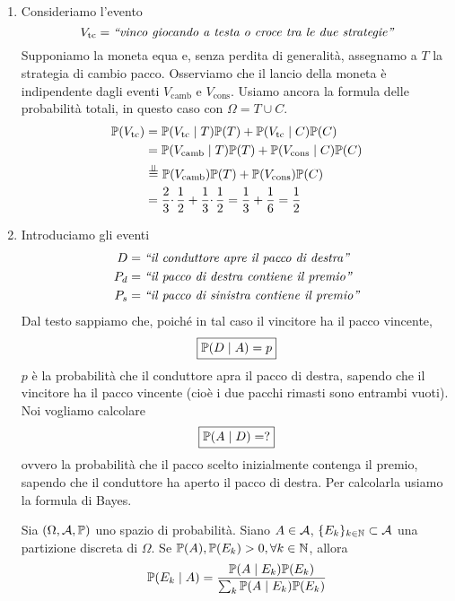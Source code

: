 \begin{enumerate}
	\item Consideriamo l'evento
	\begin{equation*}
		V_{\text{tc}} =\emph{``vinco giocando a testa o croce tra le due strategie''}
	\end{equation*}
	Supponiamo la moneta equa e, senza perdita di generalità, assegnamo a $T$ la strategia di cambio pacco. Osserviamo che il lancio della moneta è indipendente dagli eventi $V_{\text{camb}}$ e $V_{\text{cons}}$. Usiamo ancora la formula delle probabilità totali, in questo caso con $\Omega =T\cup C$.
	\begin{align*}
		\mathbb{P}(V_{\text{tc}}) & =\mathbb{P}(V_{\text{tc}} \mid T)\mathbb{P}(T) +\mathbb{P}(V_{\text{tc}} \mid C)\mathbb{P}(C) \\
		 & =\mathbb{P}(V_{\text{camb}} \mid T)\mathbb{P}(T) +\mathbb{P}(V_{\text{cons}} \mid C)\mathbb{P}(C) \\
		 & \overset{\perp \!\!\! \perp}{=} \mathbb{P}(V_{\text{camb}})\mathbb{P}(T) +\mathbb{P}(V_{\text{cons}})\mathbb{P}(C) \\
		 & =\frac{2}{3} \cdotp \frac{1}{2} +\frac{1}{3} \cdotp \frac{1}{2} =\frac{1}{3} +\frac{1}{6} =\frac{1}{2}
	\end{align*}
	\item Introduciamo gli eventi
	\begin{align*}
		D&=\emph{``il conduttore apre il pacco di destra''}\\
		P_{d} &=\emph{``il pacco di destra contiene il premio''}\\
		P_{s} &=\emph{``il pacco di sinistra contiene il premio''}
	\end{align*}
	Dal testo sappiamo che, poiché in tal caso il vincitore ha il pacco vincente,
	\begin{equation*}
		\boxed{\mathbb{P}(D\mid A) =p}
	\end{equation*}
	$p$ è la probabilità che il conduttore apra il pacco di destra, sapendo che il vincitore ha il pacco vincente (cioè i due pacchi rimasti sono entrambi vuoti). Noi vogliamo calcolare
	\begin{equation*}
		\boxed{\mathbb{P}(A\mid D) =?}
	\end{equation*}
	ovvero la probabilità che il pacco scelto inizialmente contenga il premio, sapendo che il conduttore ha aperto il pacco di destra. Per calcolarla usiamo la formula di Bayes.
	\begin{theorem}
		Sia $(\Omega,\mathcal{A},\mathbb{P})$ uno spazio di probabilità. Siano $A\in \mathcal{A}$, $\{E_{k}\}_{k\in \mathbb{N}} \subset \mathcal{A}$ una partizione discreta di $\Omega $. Se $\mathbb{P}(A) ,\mathbb{P}(E_{k})  >0,\forall k\in \mathbb{N}$, allora
		\begin{equation*}
			\mathbb{P}(E_{k} \mid A) =\frac{\mathbb{P}(A\mid E_{k})\mathbb{P}(E_{k})}{\sum_{k}\mathbb{P}(A\mid E_{k})\mathbb{P}(E_{k})}
		\end{equation*}
	\end{theorem}


\end{enumerate}
